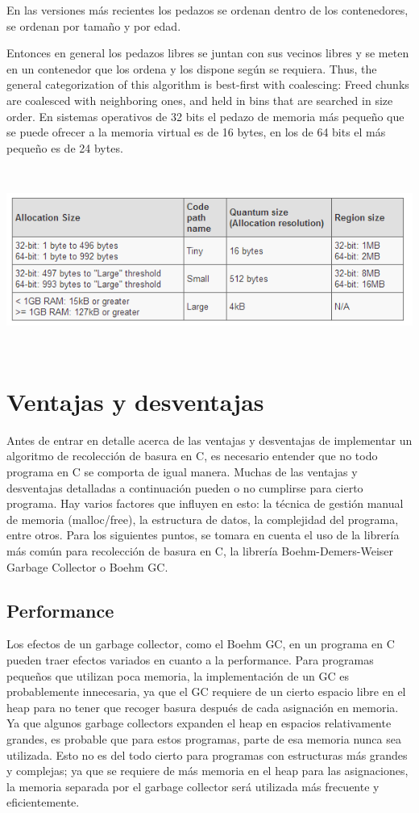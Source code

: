 \documentclass[11pt]{article} %
\begin{document}
En las versiones más recientes los pedazos se ordenan dentro de los contenedores, se ordenan por tamaño y por edad.

Entonces en general los pedazos libres se juntan con sus vecinos libres y se meten en un contenedor que los ordena y los dispone según se requiera.
Thus, the general categorization of this algorithm is best-first with coalescing: Freed chunks are coalesced with neighboring ones, and held in bins that are searched in size order.
En sistemas operativos de 32 bits el pedazo de memoria más pequeño que se puede ofrecer a la memoria virtual es de 16 bytes, en los de 64 bits el más pequeño es de 24 bytes.

\includegraphics[height=6cm]{imagenes/malloc.png}




\section{Ventajas y desventajas}
	Antes de entrar en detalle acerca de las ventajas y desventajas de implementar un algoritmo de recolección de basura en C, es necesario entender que no todo programa en C se comporta de igual manera. Muchas de las ventajas y desventajas detalladas a continuación pueden o no cumplirse para cierto programa. Hay varios factores que influyen en esto: la técnica de gestión manual de memoria (malloc/free), la estructura de datos, la complejidad del programa, entre otros.
	Para los siguientes puntos, se tomara en cuenta el uso de la librería más común para recolección de basura en C, la librería Boehm-Demers-Weiser Garbage Collector o Boehm GC.
\subsection{Performance}
	Los efectos de un garbage collector, como el Boehm GC, en un programa en C pueden traer efectos variados en cuanto a la performance. Para programas pequeños que utilizan poca memoria, la implementación de un GC es probablemente innecesaria, ya que el GC requiere de un cierto espacio libre en el heap para no tener que recoger basura después de cada asignación en memoria. Ya que algunos garbage collectors expanden el heap en espacios relativamente grandes, es probable que para estos programas, parte de esa memoria nunca sea utilizada. Esto no es del todo cierto para programas con estructuras más grandes y complejas; ya que se requiere de más memoria en el heap para las asignaciones, la memoria separada por el garbage collector será utilizada más frecuente y eficientemente.
\end{document}
